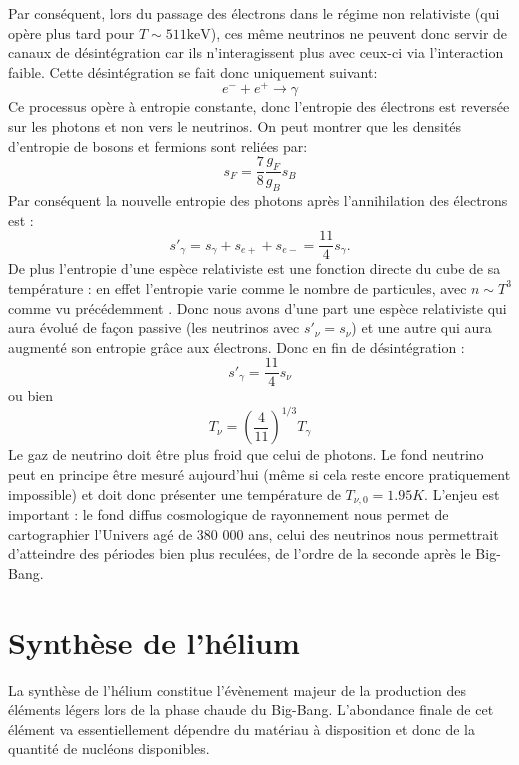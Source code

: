 Par conséquent, lors du passage des électrons dans le régime non relativiste (qui opère plus tard pour $T\sim 511 \mathrm{keV}$), ces même neutrinos ne peuvent donc servir de canaux de désintégration car ils n'interagissent plus avec ceux-ci via l'interaction faible. Cette désintégration se fait donc uniquement suivant:
\begin{equation}
e^-+e^+\rightarrow \gamma
\end{equation}
Ce processus opère à entropie constante, donc l'entropie des électrons est reversée sur les photons et non vers le neutrinos. On peut montrer que les densités d'entropie de bosons et fermions sont reliées par:
\begin{equation}
s_F=\frac{7}{8}\frac{g_F}{g_B} s_B
\end{equation}
Par conséquent la nouvelle entropie des photons après l'annihilation des électrons est :
\begin{equation}
s'_\gamma=s_\gamma+s_{e+}+s_{e-}=\frac{11}{4}s_\gamma.
\end{equation}
De plus l'entropie d'une espèce relativiste est une fonction directe du cube de sa température : en effet l'entropie varie comme le nombre de particules, avec $n\sim T^3$ comme vu précédemment . Donc nous avons d'une part une espèce relativiste qui aura évolué de façon passive  (les neutrinos avec $s'_\nu=s_\nu$) et une autre qui aura augmenté son entropie grâce aux électrons. Donc en fin de désintégration :
\begin{equation}
s'_\gamma=\frac{11}{4} s_\nu
\end{equation}
ou bien
\begin{equation}
T_\nu=\left(\frac{4}{11}\right)^{1/3} T_\gamma
\end{equation}
Le gaz de neutrino doit être plus froid que celui de photons. Le fond neutrino peut en principe être mesuré aujourd'hui (même si cela reste encore pratiquement impossible) et doit donc présenter une température de  $T_{\nu,0}=1.95 K$. L'enjeu est important : le fond diffus cosmologique de rayonnement nous permet de cartographier l'Univers agé de 380 000 ans, celui des neutrinos nous permettrait d'atteindre des périodes bien plus reculées, de l'ordre de la seconde après le Big-Bang.

\section{Synthèse de l'hélium}
La synthèse de l'hélium constitue l'évènement majeur de la production des éléments légers lors de la phase chaude du Big-Bang. L'abondance finale de cet élément va essentiellement dépendre du matériau à disposition et donc de la quantité de nucléons disponibles.

